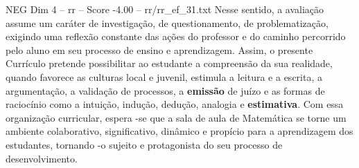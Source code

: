 \begin{textsample}{NEG Dim 4 – rr – Score -4.00 – rr/rr\_ef\_31.txt}
Nesse sentido, a avaliação assume um caráter de investigação, de questionamento, de problematização, exigindo uma reflexão constante das ações do professor e do caminho percorrido pelo aluno em seu processo de ensino e aprendizagem.
Assim, o presente Currículo pretende possibilitar ao estudante a compreensão da sua realidade, quando favorece as culturas local e juvenil, estimula a leitura e a escrita, a argumentação, a validação de processos, a \textbf{emissão} de juízo e as formas de raciocínio como a intuição, indução, dedução, analogia e \textbf{estimativa}.
Com essa organização curricular, espera -se que a sala de aula de Matemática se torne um ambiente colaborativo, significativo, dinâmico e propício para a aprendizagem dos estudantes, tornando -o sujeito e protagonista do seu processo de desenvolvimento.

\end{textsample}
